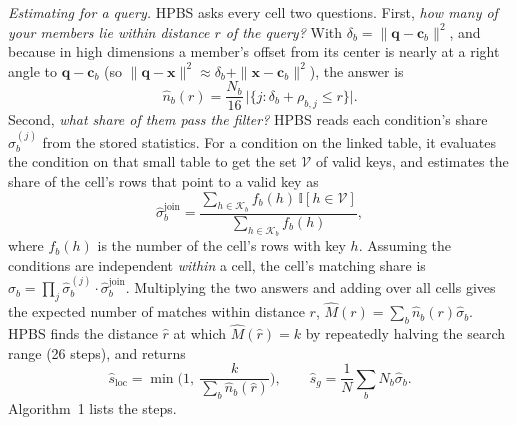 \documentclass[sigconf, nonacm]{acmart}
\begin{document}
\emph{Estimating for a query.} HPBS asks every cell two questions. First, \emph{how many of your members lie within distance $r$ of the query?} With $\delta_b=\|\mathbf{q}-\mathbf{c}_b\|^2$, and because in high dimensions a member's offset from its center is nearly at a right angle to $\mathbf{q}-\mathbf{c}_b$ (so $\|\mathbf{q}-\mathbf{x}\|^2\approx\delta_b+\|\mathbf{x}-\mathbf{c}_b\|^2$), the answer is
\begin{equation}\label{eq:ballcount}
\hat n_b(r) = \frac{N_b}{16}\,\big|\{j : \delta_b + \rho_{b,j} \le r\}\big|.
\end{equation}
Second, \emph{what share of them pass the filter?} HPBS reads each condition's share $\hat\sigma^{(j)}_b$ from the stored statistics. For a condition on the linked table, it evaluates the condition on that small table to get the set $\mathcal{V}$ of valid keys, and estimates the share of the cell's rows that point to a valid key as
\begin{equation}\label{eq:kmv_join}
\hat\sigma^{\text{join}}_b = \frac{\sum_{h\in\mathcal{K}_b} f_b(h)\,\mathbb{I}[h\in\mathcal{V}]}{\sum_{h\in\mathcal{K}_b} f_b(h)},
\end{equation}
where $f_b(h)$ is the number of the cell's rows with key $h$. Assuming the conditions are independent \emph{within} a cell, the cell's matching share is $\hat\sigma_b=\prod_j\hat\sigma^{(j)}_b\cdot\hat\sigma^{\text{join}}_b$. Multiplying the two answers and adding over all cells gives the expected number of matches within distance $r$, $\hat M(r)=\sum_b\hat n_b(r)\hat\sigma_b$. HPBS finds the distance $\hat r$ at which $\hat M(\hat r)=k$ by repeatedly halving the search range (26 steps), and returns
\begin{equation}\label{eq:sloc_hat}
\hat s_{\text{loc}} = \min\!\Big(1,\ \frac{k}{\sum_b \hat n_b(\hat r)}\Big), \qquad \hat s_g = \frac{1}{N}\sum_b N_b\hat\sigma_b .
\end{equation}
Algorithm~1 lists the steps.
\end{document}
